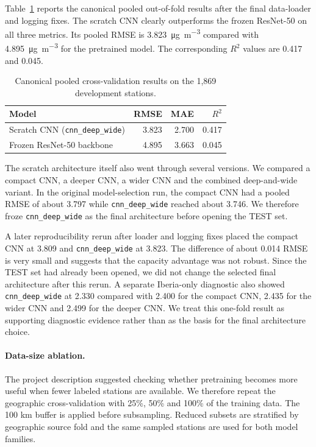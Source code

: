 \documentclass[english, a4paper]{article}
\begin{document}
Table~\ref{tab:model_comparison} reports the canonical pooled out-of-fold results after the final data-loader and logging fixes. The scratch CNN clearly outperforms the frozen ResNet-50 on all three metrics. Its pooled RMSE is \SI{3.823}{\micro\gram\per\cubic\meter} compared with \SI{4.895}{\micro\gram\per\cubic\meter} for the pretrained model. The corresponding $R^2$ values are 0.417 and 0.045.

\begin{table}[ht]
\centering
\caption{Canonical pooled cross-validation results on the 1,869 development stations.}
\label{tab:model_comparison}
\begin{tabular}{lrrr}
\toprule
Model & RMSE & MAE & $R^2$ \\
\midrule
Scratch CNN (\texttt{cnn\_deep\_wide}) & 3.823 & 2.700 & 0.417 \\
Frozen ResNet-50 backbone & 4.895 & 3.663 & 0.045 \\
\bottomrule
\end{tabular}
\end{table}

The scratch architecture itself also went through several versions. We compared a compact CNN, a deeper CNN, a wider CNN and the combined deep-and-wide variant. In the original model-selection run, the compact CNN had a pooled RMSE of about 3.797 while \texttt{cnn\_deep\_wide} reached about 3.746. We therefore froze \texttt{cnn\_deep\_wide} as the final architecture before opening the TEST set.

A later reproducibility rerun after loader and logging fixes placed the compact CNN at 3.809 and \texttt{cnn\_deep\_wide} at 3.823. The difference of about 0.014 RMSE is very small and suggests that the capacity advantage was not robust. Since the TEST set had already been opened, we did not change the selected final architecture after this rerun. A separate Iberia-only diagnostic also showed \texttt{cnn\_deep\_wide} at 2.330 compared with 2.400 for the compact CNN, 2.435 for the wider CNN and 2.499 for the deeper CNN. We treat this one-fold result as supporting diagnostic evidence rather than as the basis for the final architecture choice.

\paragraph{Data-size ablation.}
The project description suggested checking whether pretraining becomes more useful when fewer labeled stations are available. We therefore repeat the geographic cross-validation with 25\%, 50\% and 100\% of the training data. The 100 km buffer is applied before subsampling. Reduced subsets are stratified by geographic source fold and the same sampled stations are used for both model families.
\end{document}
